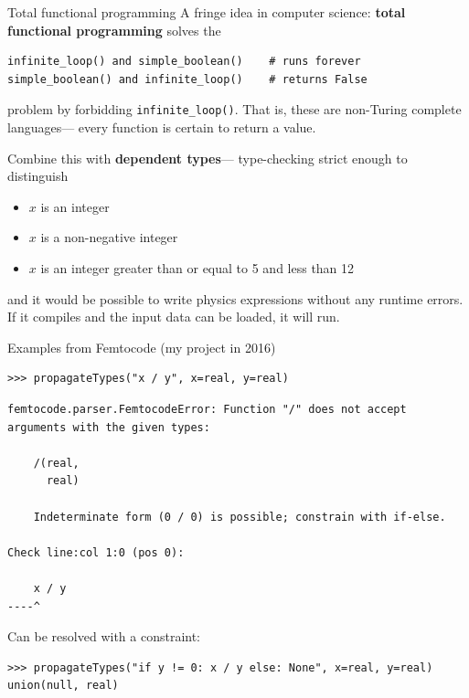 \documentclass[aspectratio=169]{beamer}
\begin{document}
\begin{frame}[fragile]{Total functional programming}
\vspace{0.25 cm}
A fringe idea in computer science: {\bf total functional programming} solves the

\small
\begin{center}
\begin{minipage}{0.8\linewidth}
\begin{verbatim}
infinite_loop() and simple_boolean()    # runs forever
simple_boolean() and infinite_loop()    # returns False
\end{verbatim}
\end{minipage}
\end{center}

\normalsize
problem by forbidding \texttt{infinite_loop()}. That is, these are non-Turing complete languages--- every function is certain to return a value.

\vspace{0.5 cm}
Combine this with {\bf dependent types}--- type-checking strict enough to distinguish
\begin{itemize}
\item $x$ is an integer
\item $x$ is a non-negative integer
\item $x$ is an integer greater than or equal to 5 and less than 12
\end{itemize}

and it would be possible to write physics expressions without any runtime errors. If it compiles and the input data can be loaded, it will run.
\end{frame}

\begin{frame}[fragile]{Examples from Femtocode (my project in 2016)}
\small
\begin{verbatim}
>>> propagateTypes("x / y", x=real, y=real)
\end{verbatim}
{\color{red}
\begin{verbatim}
femtocode.parser.FemtocodeError: Function "/" does not accept
arguments with the given types:

    /(real,
      real)

    Indeterminate form (0 / 0) is possible; constrain with if-else.

Check line:col 1:0 (pos 0):

    x / y
----^
\end{verbatim}}

{\normalsize Can be resolved with a constraint:}

\begin{verbatim}
>>> propagateTypes("if y != 0: x / y else: None", x=real, y=real)
union(null, real)
\end{verbatim}
\end{frame}
\end{document}
